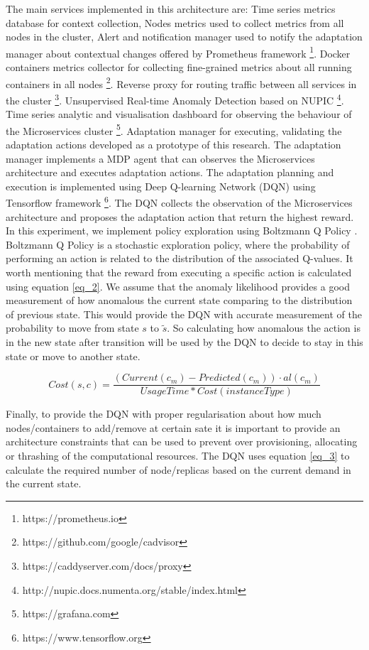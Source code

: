 \documentclass{ieeeaccess}
\begin{document}
The main services implemented in this architecture are: Time series metrics database for context collection, Nodes metrics used to collect metrics from all nodes in the cluster, Alert and notification manager used to notify the adaptation manager about contextual changes offered by Prometheus framework \footnote{https://prometheus.io}. Docker containers metrics collector for collecting fine-grained metrics about all running containers in all nodes \footnote{https://github.com/google/cadvisor}. Reverse proxy for routing traffic between all services in the cluster \footnote{https://caddyserver.com/docs/proxy}. Unsupervised Real-time Anomaly Detection based on NUPIC \footnote{http://nupic.docs.numenta.org/stable/index.html}. Time series analytic and visualisation dashboard for observing the behaviour of the Microservices cluster \footnote{https://grafana.com}. Adaptation manager for executing, validating the adaptation actions developed as a prototype of this research.  The adaptation manager implements a MDP agent that can observes the Microservices architecture and executes adaptation actions. The adaptation planning and execution is implemented using Deep Q-learning Network (DQN) using Tensorflow framework \footnote{https://www.tensorflow.org}. The  DQN collects the observation of the Microservices architecture and proposes the adaptation action that return the highest reward. In this experiment, we implement policy exploration using Boltzmann Q Policy \cite{dearden1998bayesian}. Boltzmann Q Policy  is a stochastic exploration policy, where the probability of performing an action is related to the distribution of the associated Q-values. It worth mentioning that the reward from executing a specific action is calculated using equation \ref{eq_2}. We assume that the anomaly likelihood provides a good measurement of how anomalous the current state comparing to the distribution of previous state. This would provide the DQN with accurate measurement of the probability to move from state $s$ to $\tilde{s}$. So calculating how anomalous the action is in the new state after transition will be used by the DQN to decide to stay in this state or move to another state.
 
 \begin{equation} 
\label{eq_3}
Cost(s, c) = \frac{(Current(c_{m}) - Predicted(c_{m}))\cdot al(c_{m})}{UsageTime* Cost(instanceType)}
\end{equation}

 

 Finally, to provide the DQN with proper regularisation  about how much nodes/containers to add/remove at certain sate it is important to provide an architecture constraints that can be used to prevent over provisioning, allocating or thrashing of the computational resources. The DQN uses equation \ref{eq_3} to calculate the required number of node/replicas based on the current demand in the current state. 
\end{document}
